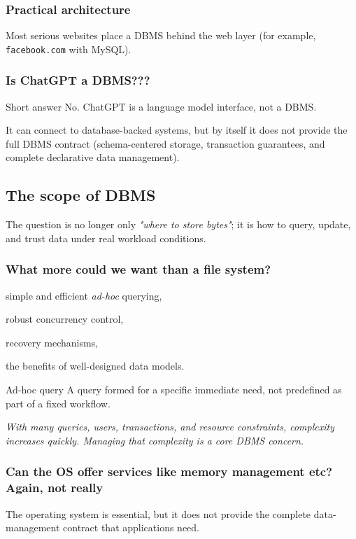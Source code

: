 \documentclass[../../dis.tex]{subfiles}
\begin{document}
\subsubsection*{Practical architecture}
Most serious websites place a DBMS behind the web layer (for example, \texttt{facebook.com} with MySQL).

\subsubsection*{Is ChatGPT a DBMS???}
\begin{concept}{Short answer}
No. ChatGPT is a language model interface, not a DBMS.
\end{concept}

It can connect to database-backed systems, but by itself it does not provide the full DBMS contract (schema-centered storage, transaction guarantees, and complete declarative data management).

\subsection{The scope of DBMS}
The question is no longer only \emph{"where to store bytes"}; it is how to query, update, and trust data under real workload conditions.

\subsubsection{What more could we want than a file system?}
\begin{dashlist}
    \item simple and efficient \emph{ad-hoc} querying,
    \item robust concurrency control,
    \item recovery mechanisms,
    \item the benefits of well-designed data models.
\end{dashlist}

\begin{concept}{Ad-hoc query}
A query formed for a specific immediate need, not predefined as part of a fixed workflow.
\end{concept}

\textit{With many queries, users, transactions, and resource constraints, complexity increases quickly. Managing that complexity is a core DBMS concern.}

\subsubsection{Can the OS offer services like memory management etc? Again, not really}
The operating system is essential, but it does not provide the complete data-management contract that applications need.
\end{document}
